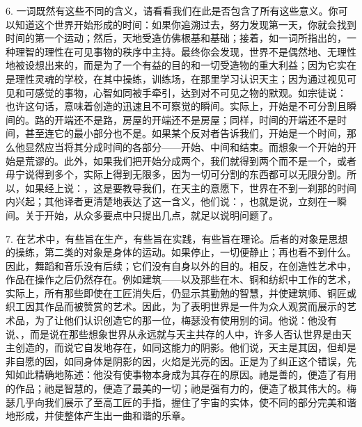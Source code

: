 6. 一词既然有这些不同的含义，请看看我们在此是否包含了所有这些意义。你可以知道这个世界开始形成的时间：如果你追溯过去，努力发现第一天，你就会找到时间的第一个运动；然后，天地受造仿佛根基和基础；接着，如一词所指出的，一种理智的理性在可见事物的秩序中主持。最终你会发现，世界不是偶然地、无理性地被设想出来的，而是为了一个有益的目的和一切受造物的重大利益；因为它实在是理性灵魂的学校，在其中操练，训练场，在那里学习认识天主；因为通过视见可见和可感觉的事物，心智如同被手牵引，达到对不可见之物的默观。如宗徒说：  也许这句话，意味着创造的迅速且不可察觉的瞬间。实际上，开始是不可分割且瞬间的。路的开端还不是路，房屋的开端还不是房屋；同样，时间的开端还不是时间，甚至连它的最小部分也不是。如果某个反对者告诉我们，开始是一个时间，那么他显然应当将其分成时间的各部分——开始、中间和结束。而想象一个开始的开始是荒谬的。此外，如果我们把开始分成两个，我们就得到两个而不是一个，或者毋宁说得到多个，实际上得到无限多，因为一切可分割的东西都可以无限分割。所以，如果经上说：，这是要教导我们，在天主的意愿下，世界在不到一刹那的时间内兴起；其他译者更清楚地表达了这一含义，他们说：，也就是说，立刻在一瞬间。关于开始，从众多要点中只提出几点，就足以说明问题了。\par

7. 在艺术中，有些旨在生产，有些旨在实践，有些旨在理论。后者的对象是思想的操练，第二类的对象是身体的运动。如果停止，一切便静止；再也看不到什么。因此，舞蹈和音乐没有后续；它们没有自身以外的目的。相反，在创造性艺术中，作品在操作之后仍然存在。例如建筑——以及那些在木、铜和纺织中工作的艺术，实际上，所有那些即使在工匠消失后，仍显示其勤勉的智慧，并使建筑师、铜匠或织工因其作品而被赞赏的艺术。因此，为了表明世界是一件为众人观赏而展示的艺术品，为了让他们认识创造它的那一位，梅瑟没有使用别的词。他说：他没有说、，而是说在那些想象世界从永远就与天主共存的人中，许多人否认世界是由天主创造的，而说它自发地存在，如同这能力的阴影。他们说，天主是其因，但却是非自愿的因，如同身体是阴影的因，火焰是光亮的因。正是为了纠正这个错误，先知如此精确地陈述：他没有使事物本身成为其存在的原因。祂是善的，便造了有用的作品；祂是智慧的，便造了最美的一切；祂是强有力的，便造了极其伟大的。梅瑟几乎向我们展示了至高工匠的手指，握住了宇宙的实体，使不同的部分完美和谐地形成，并使整体产生出一曲和谐的乐章。\par

